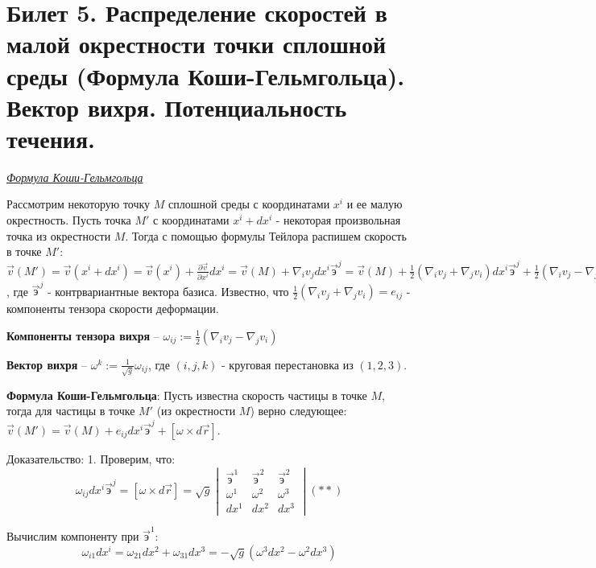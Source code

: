 \newpage
\section{Билет 5. Распределение скоростей в малой окрестности точки сплошной среды (Формула Коши-Гельмгольца). Вектор вихря. Потенциальность течения.}

\begin{center}
  \textit{\underline{Формула Коши-Гельмгольца}}
\end{center}

Рассмотрим некоторую точку $M$ сплошной среды с координатами $x^i$ и ее малую окрестность. Пусть точка $M'$ с координатами $x^i + dx^i$ - некоторая произвольная точка из окрестности $M$. Тогда с помощью формулы Тейлора распишем скорость в точке $M'$:
$
  \vec{v} (M') = \vec{v} (x^i + dx^i) = \vec{v}(x^i) + \frac{\partial \vec{v}}{\partial x^i}dx^i = \vec{v} (M) + \nabla_i v_j dx^i \vec{\text{э}}^j = \vec{v} (M) + \frac{1}{2}(\nabla_i v_j  + \nabla_j v_i)dx^i \vec{\text{э}}^j + \frac{1}{2}(\nabla_i v_j  - \nabla_j v_i)dx^i \vec{\text{э}}^j (*)
$, где $\vec{\text{э}}^j$ - контрвариантные вектора базиса. Известно, что $\frac{1}{2}(\nabla_i v_j + \nabla_j v_i) = e_{ij}$ - компоненты тензора скорости деформации.

 \textbf{Компоненты тензора вихря} -- $ \omega_{ij} := \frac{1}{2}(\nabla_i v_j - \nabla_j v_i)$

 \textbf{Вектор вихря} -- $\omega^k := \frac{1}{\sqrt{g}}\omega_{ij}$, где  $(i, j, k)$ - круговая перестановка из $(1, 2, 3)$.

\state \textbf{Формула Коши-Гельмгольца}: Пусть известна скорость частицы в точке $M$, тогда для частицы в точке $M'$ (из окрестности $M$) верно следующее: $\vec{v}(M') = \vec{v}(M) + e_{ij}dx^i \vec{{\text{э}}}^j + [\omega \times d\vec{r}]$.

Доказательство:
1. Проверим, что:
\begin{equation*}
  \omega_{ij}dx^i \vec{\text{э}}^j = [\omega \times d\vec{r}] = \sqrt{g}
  \begin{vmatrix}
    \vec{\text{э}}^1 & \vec{\text{э}}^2 & \vec{\text{э}}^2 \\
    \omega^1         & \omega^2         & \omega^3         \\
    dx^1             & dx^2             & dx^3
  \end{vmatrix}
  (**)
\end{equation*}

Вычислим компоненту при $\vec{\text{э}}^1$:
$$\omega_{i1}dx^i = \omega_{21}dx^2 + \omega_{31}dx^3 = -\sqrt{g}(\omega^3 dx^2 - \omega^2dx^3)$$

